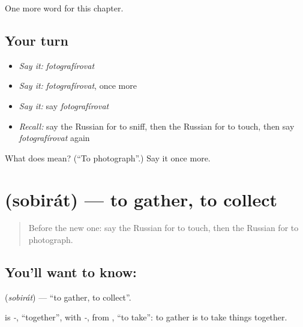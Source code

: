 \begin{grammarlens}[title={What you've built}]
One more word for this chapter.
\end{grammarlens}

\subsection*{Your turn}
\begin{itemize}
\raggedright
  \item \emph{Say it:} \emph{fotografírovat}
  \item \emph{Say it:} \emph{fotografírovat}, once more
  \item \emph{Say it:} say \emph{fotografírovat}
  \item \emph{Recall:} say the Russian for to sniff, then the Russian for to touch, then say \emph{fotografírovat} again
\end{itemize}

\begin{tcolorbox}[breakable,colback=teal!4,colframe=teal!35!black,title={Before you move on}]
What does  mean? (\textquotedblleft{}To photograph\textquotedblright{}.) Say it once more.
\end{tcolorbox}
\section[\texorpdfstring{\ru{собирать} (sobirát)}{собирать (sobirát)}]{ (sobirát) — to gather, to collect}

\label{lesson:RU-C209-sobirat}



\begin{quote}
Before the new one: say the Russian for to touch, then the Russian for to photograph.
\end{quote}

\subsection*{You'll want to know: }
\textbf{} (\emph{sobirát}) — \textquotedblleft{}to gather, to collect\textquotedblright{}.

\begin{cousinweb}
\textbf{} is \emph{-}, \textquotedblleft{}together\textquotedblright{}, with \emph{-}, from \emph{}, \textquotedblleft{}to take\textquotedblright{}: to gather is to take things together.
\end{cousinweb}

